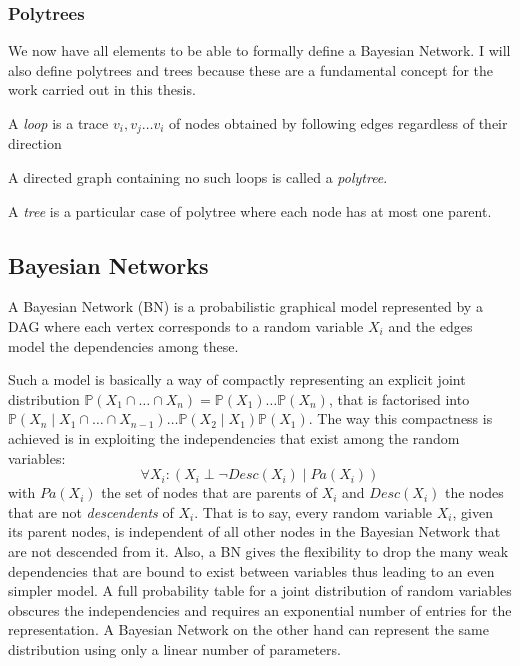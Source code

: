 \subsubsection{Polytrees}
We now have all elements to be able to formally define a Bayesian Network.
I will also define polytrees and trees because these are a fundamental concept for the work carried out in this thesis.
\begin{definition}
	A \textit{loop} is a trace $v_i, v_j \ldots v_i$ of nodes obtained by following edges regardless of their direction
\end{definition}
\begin{definition}
	A directed graph containing no such loops is called a \textit{polytree}. 
\end{definition}
\begin{definition}
	A \textit{tree} is a particular case of polytree where each node has at most one parent.	
\end{definition}

\subsection{Bayesian Networks} \label{subsec:bayesiannetworks}
\begin{definition}
	A Bayesian Network (BN) is a probabilistic graphical model represented by a DAG where each vertex corresponds to a random variable $X_i$ and the edges model the dependencies among these.
\end{definition}
Such a model is basically a way of compactly representing an explicit joint distribution $\mathbb{P}(X_1 \cap \ldots \cap X_n) = \mathbb{P}(X_1) \ldots \mathbb{P}(X_n)$, that is factorised into $\mathbb{P}(X_n \mid X_1 \cap \ldots \cap X_{n-1}) \ldots \mathbb{P}(X_2 \mid X_1 ) \mathbb{P}(X_1) $.
The way this compactness is achieved is in exploiting the independencies that exist among the random variables:
\begin{equation} \label{eq:bnindependencies}
	\forall X_i:  ( X_i \perp \neg Desc(X_i) \mid Pa(X_i))
\end{equation}
with $Pa(X_i)$ the set of nodes that are parents of $X_i$ and $Desc(X_i)$ the nodes that are not \textit{descendents} of $X_i$.
That is to say, every random variable $X_i$, given its parent nodes, is independent of all other nodes in the Bayesian Network that are not descended from it.
Also, a BN gives the flexibility to drop the many weak dependencies that are bound to exist between variables thus leading to an even simpler model.
A full probability table for a joint distribution of random variables obscures the independencies and requires an exponential number of entries for the representation.
A Bayesian Network on the other hand can represent the same distribution using only a linear number of parameters.

